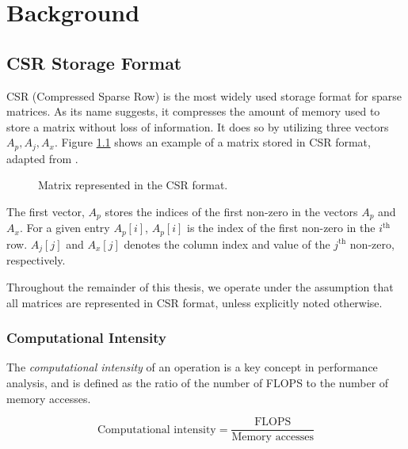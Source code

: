 \chapter{Background}

\section{CSR Storage Format}
CSR (Compressed Sparse Row) is the most widely used storage format for sparse matrices. As its name suggests, it compresses the amount of memory used to store a matrix without loss of information. It does so by utilizing three vectors \(A_{p}, A_{j}, A_{x}\). Figure \ref{fig:csrformat} shows an example of a matrix stored in CSR format, adapted from \cite{gupta2024gamgi}.

\begin{figure}[ht]
    \centering
    \caption{Matrix represented in the CSR format.}
    \label{fig:csrformat}
\end{figure}

The first vector, \(A_{p}\) stores the indices of the first non-zero in the vectors \(A_{p}\) and \(A_{x}\). For a given entry \(A_{p}[i]\), \(A_{p}[i]\) is the index of the first non-zero in the \(i^{\text{th}}\) row. \(A_{j}[j]\) and \(A_{x}[j]\) denotes the column index and value of the \(j^{\text{th}}\) non-zero, respectively.
\medskip

Throughout the remainder of this thesis, we operate under the assumption that all matrices are represented in CSR format, unless explicitly noted otherwise.


\subsection{Computational Intensity}

The \textit{computational intensity} of an operation is a key concept in performance analysis, and is defined as the ratio of the number of FLOPS to the number of memory accesses.

\begin{equation}
    \text{Computational intensity} = \frac{\text{FLOPS}}{\text{Memory accesses}}
    \label{eq:computationaldensity}
\end{equation}

